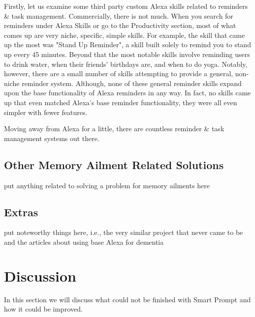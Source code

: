 \documentclass[11pt, oneside]{article}
\begin{document}
Firstly, let us examine some third party custom Alexa skills related to reminders \& task management. 
Commercially, there is not much. 
When you search for reminders under Alexa Skills or go to the Productivity section, most of what comes up are very niche, specific, simple skills. 
For example, the skill that came up the most was "Stand Up Reminder", a skill built solely to remind you to stand up every 45 minutes. 
Beyond that the most notable skills involve reminding users to drink water, when their friends' birthdays are, and when to do yoga. 
Notably, however, there are a small number of skills attempting to provide a general, non-niche reminder system. 
Although, none of these general reminder skills expand upon the base functionality of Alexa reminders in any way. 
In fact, no skills came up that even matched Alexa's base reminder functionality, they were all even simpler with fewer features. 

Moving away from Alexa for a little, there are countless reminder \& task management systems out there. 

\subsection{Other Memory Ailment Related Solutions}

put anything related to solving a problem for memory ailments here

\subsection{Extras}

put noteworthy things here, i.e., the very similar project that never came to be and the articles about using base Alexa for dementia


\section{Discussion}

In this section we will discuss what could not be finished with Smart Prompt and how it could be improved. 
\end{document}
